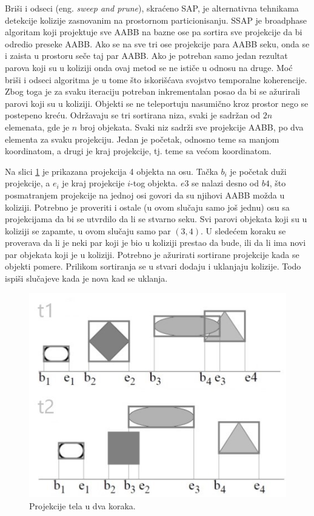 \documentclass[12pt,oneside]{memoir}
\begin{document}
Briši i odseci (eng. {\em sweep and prune}), skraćeno SAP, je alternativna tehnikama detekcije kolizije 
zasnovanim na prostornom particionisanju.
SSAP je broadphase algoritam koji projektuje sve AABB
na bazne ose pa sortira sve projekcije da bi odredio preseke AABB.
Ako se na sve tri ose projekcije para AABB seku, onda se i zaista u prostoru seče taj par AABB.
Ako je potreban samo jedan rezultat parova koji su u koliziji onda ovaj metod se ne ističe u odnosu na druge.
Moć briši i odseci algoritma je u tome što iskorišćava svojstvo temporalne koherencije.
Zbog toga je za svaku iteraciju potreban inkrementalan posao da bi se ažurirali parovi koji su u koliziji.
Objekti se ne teleportuju nasumično kroz prostor nego se postepeno kreću. 
Održavaju se tri sortirana niza, svaki je sadržan od $2n$ elemenata, gde je $n$ broj objekata.
Svaki niz sadrži sve projekcije AABB, po dva elementa za svaku projekciju. 
Jedan je početak, odnosno teme sa manjom koordinatom, a drugi je kraj projekcije, tj. teme sa većom koordinatom. 

Na slici \ref{fig:sap} je prikazana projekcija 4 objekta na osu. 
Tačka $b_i$ je početak duži projekcije, a $e_i$ je kraj projekcije $i$-tog objekta.
$e3$ se nalazi desno od $b4$, što posmatranjem projekcije na jednoj osi govori da su njihovi AABB možda u koliziji.
Potrebno je proveriti i ostale (u ovom slučaju samo još jednu) osu sa projekcijama da bi se utvrdilo da li se stvarno seku.
Svi parovi objekata koji su u koliziji se zapamte, u ovom slučaju samo par $(3, 4)$.
U sledećem koraku se proverava da li je neki par koji je bio u koliziji prestao da bude, ili da li ima novi par objekata koji je u koliziji.
Potrebno je ažurirati sortirane projekcije kada se objekti pomere. Prilikom sortiranja se u stvari dodaju i uklanjaju kolizije.
Todo ispiši slučajeve kada je nova kad se uklanja.

\begin{figure}[h!]
	\begin{center}
	\includegraphics[scale=1]{sap.jpg}
	\end{center}
	\caption{Projekcije tela u dva koraka.}
	\label{fig:sap}
\end{figure}
\end{document}
